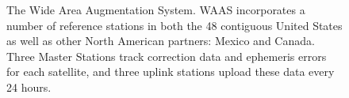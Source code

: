 

\begin{figure}
	\centering
	\caption{The Wide Area Augmentation System.  WAAS incorporates a number of reference stations in both the 48 contiguous United States as well as other North American partners: Mexico and Canada.  Three Master Stations track correction data and ephemeris errors for each satellite, and three uplink stations upload these data every 24 hours.}
	\label{fig:WAAS-Overview-1}
\end{figure}



